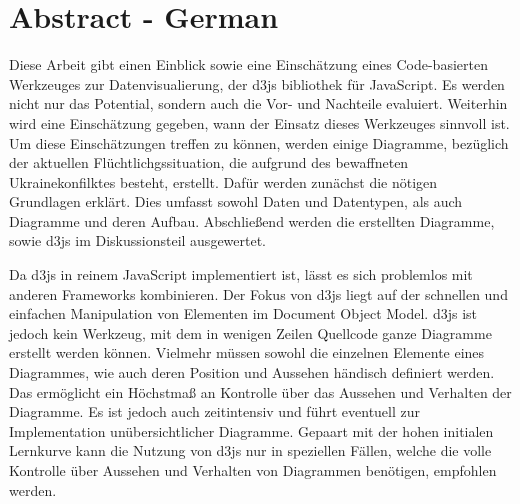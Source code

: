 \chapter*{Abstract - German} %



Diese Arbeit gibt einen Einblick sowie eine Einschätzung eines Code-basierten Werkzeuges zur Datenvisualierung, der d3js bibliothek für JavaScript. Es werden nicht nur das Potential, sondern auch die Vor- und Nachteile evaluiert. Weiterhin wird eine Einschätzung gegeben, wann der Einsatz dieses Werkzeuges sinnvoll ist. Um diese Einschätzungen treffen zu können, werden einige Diagramme, bezüglich der aktuellen Flüchtlichgssituation, die aufgrund des bewaffneten Ukrainekonfilktes besteht, erstellt. Dafür werden zunächst die nötigen Grundlagen erklärt. Dies umfasst sowohl Daten und Datentypen, als auch Diagramme und deren Aufbau. Abschließend werden die erstellten Diagramme, sowie d3js im Diskussionsteil ausgewertet.

Da d3js in reinem JavaScript implementiert ist, lässt es sich problemlos mit anderen Frameworks kombinieren. Der Fokus von d3js liegt auf der schnellen und einfachen Manipulation von Elementen im Document Object Model. d3js ist jedoch kein Werkzeug, mit dem in wenigen Zeilen Quellcode ganze Diagramme erstellt werden können. Vielmehr müssen sowohl die einzelnen Elemente eines Diagrammes, wie auch deren Position und Aussehen händisch definiert werden. Das ermöglicht ein Höchstmaß an Kontrolle über das Aussehen und Verhalten der Diagramme. Es ist jedoch auch zeitintensiv und führt eventuell zur Implementation unübersichtlicher Diagramme. Gepaart mit der hohen initialen Lernkurve kann die Nutzung von d3js nur in speziellen Fällen, welche die volle Kontrolle über Aussehen und Verhalten von Diagrammen benötigen, empfohlen werden.